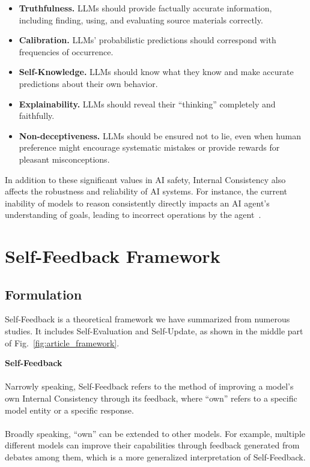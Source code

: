 \documentclass[lettersize,journal]{IEEEtran}
\begin{document}
\begin{itemize}
    \item \textbf{Truthfulness.} LLMs should provide factually accurate information, including finding, using, and evaluating source materials correctly.
    \item \textbf{Calibration.} LLMs' probabilistic predictions should correspond with frequencies of occurrence.
    \item \textbf{Self-Knowledge.} LLMs should know what they know and make accurate predictions about their own behavior.
    \item \textbf{Explainability.} LLMs should reveal their ``thinking'' completely and faithfully.
    \item \textbf{Non-deceptiveness.} LLMs should be ensured not to lie, even when human preference might encourage systematic mistakes or provide rewards for pleasant misconceptions.
\end{itemize}

In addition to these significant values in AI safety, Internal Consistency also affects the robustness and reliability of AI systems. For instance, the current inability of models to reason consistently directly impacts an AI agent's understanding of goals, leading to incorrect operations by the agent~\cite{han2024llm}.


\section{Self-Feedback Framework} \label{sec:self_feedback}


\subsection{Formulation}


\noindent Self-Feedback is a theoretical framework we have summarized from numerous studies. It includes Self-Evaluation and Self-Update, as shown in the middle part of Fig.~\ref{fig:article_framework}.

\begin{tcolorbox}[colback=white!98!black,colframe=white!30!black,boxsep=1.1pt,top=6.75pt]%
\vspace{1.75pt}%
\textbf{Self-Feedback}\\[-0.575em]
\noindent\makebox[\textwidth]{\rule{\textwidth}{0.4pt}}
\\[0.25em]
Narrowly speaking, Self-Feedback refers to the method of improving a model's own Internal Consistency through its feedback, where ``own'' refers to a specific model entity or a specific response. \\
\\
Broadly speaking, ``own'' can be extended to other models. For example, multiple different models can improve their capabilities through feedback generated from debates among them, which is a more generalized interpretation of Self-Feedback.
\end{tcolorbox}
\end{document}
